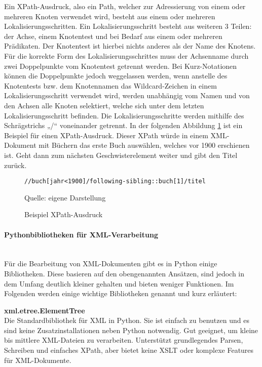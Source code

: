 Ein XPath-Ausdruck, also ein Path, welcher zur Adressierung von einem oder mehreren Knoten verwendet wird,
besteht aus einem oder mehreren Lokalisierungsschritten.
Ein Lokalisierungsschritt besteht aus weiteren 3 Teilen: der Achse, einem Knotentest und bei Bedarf aus einem oder mehreren Prädikaten.
Der Knotentest ist hierbei nichts anderes als der Name des Knotens.
Für die korrekte Form des Lokalisierungsschrittes muss der Achsenname durch zwei Doppelpunkte vom Knotentest getrennt werden.
Bei Kurz-Notationen können die Doppelpunkte jedoch weggelassen werden, wenn anstelle des Knotentests bzw.
dem Knotennamen das Wildcard-Zeichen in einem Lokalisierungsschritt verwendet wird,
werden unabhängig vom Namen und von den Achsen alle Knoten selektiert, welche sich unter dem letzten Lokalisierungsschritt befinden.
Die Lokalisierungsschritte werden mithilfe des Schrägstrichs „/“ voneinander getrennt. \cite{XPath2025}
In der folgenden Abbildung \ref{fig: XPath-Ausdruck} ist ein Beispiel für einen XPath-Ausdruck.
Dieser XPath würde in einem XML-Dokument mit Büchern das erste Buch auswählen, welches vor 1900 erschienen ist.
Geht dann zum nächsten Geschwisterelement weiter und gibt den Titel zurück.


\begin{figure}[H]
\centering
\begin{minipage}{0.95\textwidth}
\begin{lstlisting}[language=XPath]
//buch[jahr<1900]/following-sibling::buch[1]/titel
\end{lstlisting}
\end{minipage}
\caption{Beispiel XPath-Ausdruck}
\label{fig: XPath-Ausdruck}
    {Quelle: eigene Darstellung}
\end{figure}


\paragraph{Pythonbibliotheken für XML-Verarbeitung}\mbox{}\\

Für die Bearbeitung von \ac{XML}-Dokumenten gibt es in Python einige Bibliotheken.
Diese basieren auf den obengenannten Ansätzen, sind jedoch in dem Umfang deutlich kleiner gehalten und bieten weniger Funktionen.
Im Folgenden werden einige wichtige Bibliotheken genannt und kurz erläutert:

\textbf{xml.etree.ElementTree}\\
Die Standardbibliothek für XML in Python.
Sie ist einfach zu benutzen und es sind keine Zusatzinstallationen neben Python notwendig.
Gut geeignet, um kleine bis mittlere XML-Dateien zu verarbeiten.
Unterstützt grundlegendes Parsen, Schreiben und einfaches XPath, aber bietet keine \ac{XSLT} oder komplexe Features für \ac{XML}-Dokumente. \cite*{ElementTree2025}

